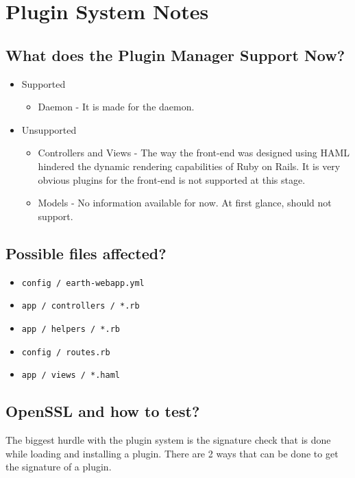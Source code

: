 \documentclass{article}
\begin{document}
\section*{Plugin System Notes}

\subsection*{What does the Plugin Manager Support Now?}

\begin{itemize}
	\item Supported
		\begin{itemize}
			\item Daemon - It is made for the daemon.
		\end{itemize}
	\item Unsupported
		\begin{itemize}
			\item Controllers and Views - The way the front-end was designed using HAML hindered the dynamic rendering capabilities of Ruby on Rails. It is very obvious plugins for the front-end is not supported at this stage. 
			\item Models - No information available for now. At first glance, should not support.
		\end{itemize}
\end{itemize}

\subsection*{Possible files affected?}

\begin{itemize}
	\item \texttt{config / earth-webapp.yml}
	\item \texttt{app / controllers / *.rb}
	\item \texttt{app / helpers / *.rb}
	\item \texttt{config / routes.rb}
	\item \texttt{app / views / *.haml}
\end{itemize}

\subsection*{OpenSSL and how to test?}

The biggest hurdle with the plugin system is the signature check that is done while loading and installing a plugin. There are 2 ways that can be done to get the signature of a plugin. 
\end{document}
